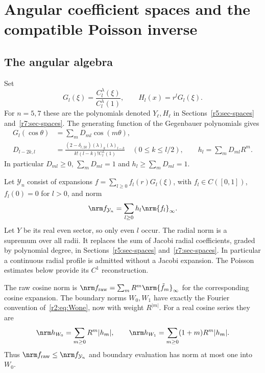 \section{Angular coefficient spaces and the compatible Poisson inverse}
\label{gd:sec:spaces}

\subsection{The angular algebra}\label{gd:sec:algebra}
Set
\[
 G_l(\xi)=\frac{C_l^\lambda(\xi)}{C_l^\lambda(1)},\qquad
 H_l(x)=r^lG_l(\xi).
\]
For $n=5,7$ these are the polynomials denoted $Y_\ell,H_\ell$ in
Sections~\ref{r5:sec-spaces} and~\ref{r7:sec-spaces}.
The generating function of the Gegenbauer polynomials gives
\begin{equation}\label{gd:eq:cosine}
 \begin{split}
 G_l(\cos\theta)&=\sum_mD_{ml}\cos(m\theta),\\
 D_{l-2k,l}&=
 \frac{(2-\delta_{l,2k})(\lambda)_k(\lambda)_{l-k}}
 {k!(l-k)!C_l^\lambda(1)}
 \quad(0\le k\le l/2),\qquad
 h_l=\sum_m D_{ml}R^m .
 \end{split}
\end{equation}
In particular $D_{ml}\ge0$, $\sum_mD_{ml}=1$ and
$h_l\ge\sum_mD_{ml}=1$.

Let $\mathcal Y_n$ consist of expansions
$f=\sum_{l\ge0}f_l(r)G_l(\xi)$, with $f_l\in C([0,1])$,
$f_l(0)=0$ for $l>0$, and norm
\begin{equation}\label{gd:eq:Y}
 \nrm f_{\mathcal Y_n}=\sum_{l\ge0}h_l\nrm{f_l}_\infty.
\end{equation}
Let $Y$ be its real even sector, so only even $l$ occur.
The radial norm is a supremum over all radii. It replaces the sum of
Jacobi radial coefficients, graded by polynomial degree, in
Sections~\ref{r5:sec-spaces} and~\ref{r7:sec-spaces}.
In particular a continuous radial profile is admitted without a Jacobi
expansion. The Poisson estimates below provide its $C^1$ reconstruction.

The raw cosine norm is
$\nrm f_{\rm raw}=\sum_mR^m\nrm{\tilde f_m}_\infty$ for the corresponding
cosine expansion. The boundary norms $W_0,W_1$ have exactly the Fourier
convention of~\eqref{r2:eq:Wone}, now with weight $R^{|m|}$.
For a real cosine series they are
\[
 \nrm h_{W_0}=\sum_{m\ge0}R^m|h_m|,\qquad
 \nrm h_{W_1}=\sum_{m\ge0}(1+m)R^m|h_m|.
\]
Thus $\nrm f_{\rm raw}\le\nrm f_{\mathcal Y_n}$ and boundary evaluation
has norm at most one into $W_0$.

